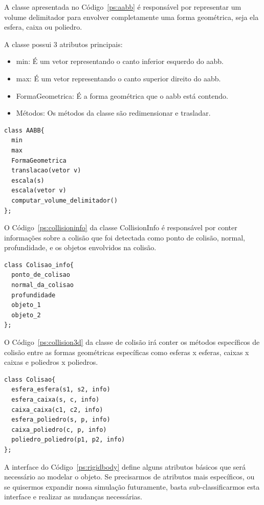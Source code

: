 A classe apresentada no Código~\ref{ps:aabb}  é responsável por representar um volume delimitador para envolver completamente uma forma geométrica, seja ela esfera, caixa ou poliedro.

A classe possui 3 atributos principais:
\begin{itemize}
  \item min: É um vetor representando o canto inferior esquerdo do aabb.
  \item max: É um vetor representando o canto superior direito do aabb.
  \item FormaGeometrica: É a forma geométrica que o aabb está contendo.
  \item Métodos: Os métodos da classe são redimensionar e trasladar.
\end{itemize}

\begin{lstlisting}[frame=single,caption=Modelagem prévia para AABB\label{ps:aabb}]
class AABB{
  min
  max
  FormaGeometrica
  translacao(vetor v)
  escala(s)
  escala(vetor v)
  computar_volume_delimitador()
};
\end{lstlisting}


O Código~\ref{ps:collisioninfo} da classe CollisionInfo é responsável por conter informações sobre a colisão que foi detectada como ponto de colisão, normal, profundidade, e os objetos envolvidos na colisão.


\begin{lstlisting}[frame=single,caption=Modelagem prévia para coletor de informações\label{ps:collisioninfo}]
class Colisao_info{
  ponto_de_colisao
  normal_da_colisao
  profundidade
  objeto_1
  objeto_2
};
\end{lstlisting}

O Código~\ref{ps:collision3d} da classe de colisão irá conter os métodos específicos de colisão entre as formas geométricas específicas como esferas x esferas, caixas x caixas e poliedros x poliedros.

\begin{lstlisting}[frame=single,caption=Modelagem prévia para classe estática para colisões\label{ps:collision3d}]
class Colisao{
  esfera_esfera(s1, s2, info)
  esfera_caixa(s, c, info)
  caixa_caixa(c1, c2, info)
  esfera_poliedro(s, p, info)
  caixa_poliedro(c, p, info)
  poliedro_poliedro(p1, p2, info)
};
\end{lstlisting}


A interface do Código~\ref{ps:rigidbody} define alguns atributos básicos que será necessário ao modelar o objeto. Se precisarmos de atributos mais específicos, ou se quisermos expandir nossa simulação futuramente, basta sub-classificarmos esta interface e realizar as mudanças necessárias.

